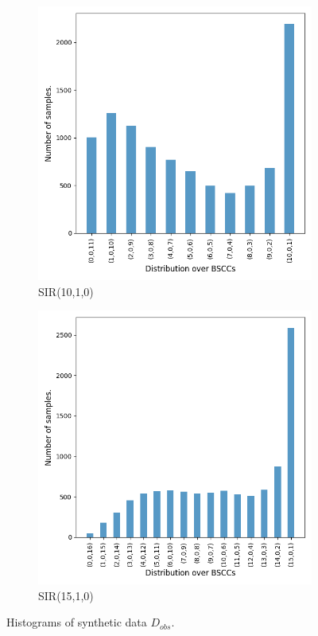 \begin{figure}[H]
\begin{subfigure}{0.3\textwidth}
        \includegraphics[width=\linewidth]{figures/sir1010_data.png}
        \caption{SIR(10,1,0)}
    \end{subfigure}
    \hfill
    \begin{subfigure}{0.3\textwidth}
        \centering
        \includegraphics[width=\linewidth]{figures/sir1510_data.png}
        \caption{SIR(15,1,0)}
    \end{subfigure}
    \caption{Histograms of synthetic data $D_{obs}$.}
\end{figure}

